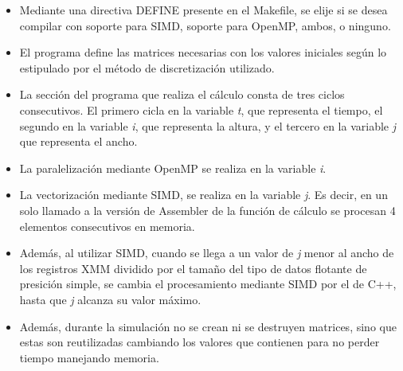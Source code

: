 \begin{itemize}
	\item Mediante una directiva DEFINE presente en el Makefile, se elije si se desea compilar con soporte para SIMD, soporte para OpenMP, ambos, o ninguno.

	\item El programa define las matrices necesarias con los valores iniciales según lo estipulado por el método de discretización utilizado.

	\item La sección del programa que realiza el cálculo consta de tres ciclos consecutivos. El primero cicla en la variable \textit{t}, que representa el tiempo, el segundo en la variable \textit{i}, que representa la altura, y el tercero en la variable \textit{j} que representa el ancho.
	
    \item La paralelización mediante OpenMP se realiza en la variable \textit{i}.
	
    \item La vectorización mediante SIMD, se realiza en la variable \textit{j}. Es decir, en un solo llamado a la versión de Assembler de la función de cálculo se procesan 4 elementos consecutivos en memoria.

    \item Además, al utilizar SIMD, cuando se llega a un valor de \textit{j} menor al ancho de los registros XMM dividido por el tamaño del tipo de datos flotante de presición simple, se cambia el procesamiento mediante SIMD por el de C++, hasta que \textit{j} alcanza su valor máximo.

	\item Además, durante la simulación no se crean ni se destruyen matrices, sino que estas son reutilizadas cambiando los valores que contienen para no perder tiempo manejando memoria.
\end{itemize}